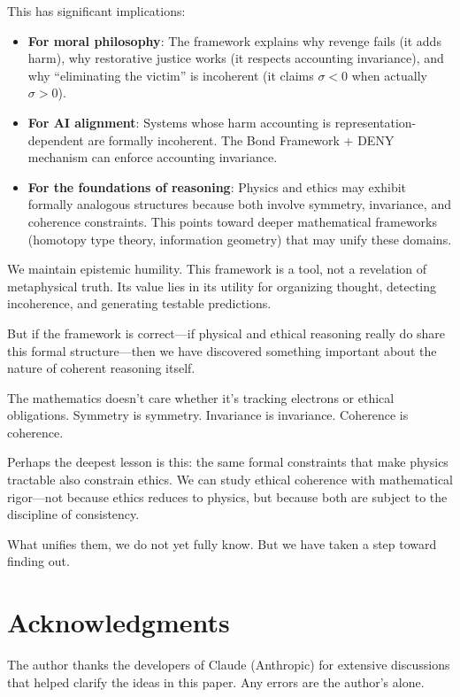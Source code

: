 \documentclass[12pt,letterpaper]{article}
\theoremstyle{definition}
\theoremstyle{remark}
\begin{document}
This has significant implications:
\begin{itemize}
    \item \textbf{For moral philosophy}: The framework explains why revenge fails (it adds harm), why restorative justice works (it respects accounting invariance), and why ``eliminating the victim'' is incoherent (it claims $\sigma < 0$ when actually $\sigma > 0$).
    
    \item \textbf{For AI alignment}: Systems whose harm accounting is representation-dependent are formally incoherent. The Bond Framework + DENY mechanism can enforce accounting invariance.
    
    \item \textbf{For the foundations of reasoning}: Physics and ethics may exhibit formally analogous structures because both involve symmetry, invariance, and coherence constraints. This points toward deeper mathematical frameworks (homotopy type theory, information geometry) that may unify these domains.
\end{itemize}

We maintain epistemic humility. This framework is a tool, not a revelation of metaphysical truth. Its value lies in its utility for organizing thought, detecting incoherence, and generating testable predictions.

But if the framework is correct---if physical and ethical reasoning really do share this formal structure---then we have discovered something important about the nature of coherent reasoning itself.

The mathematics doesn't care whether it's tracking electrons or ethical obligations. Symmetry is symmetry. Invariance is invariance. Coherence is coherence.

Perhaps the deepest lesson is this: the same formal constraints that make physics tractable also constrain ethics. We can study ethical coherence with mathematical rigor---not because ethics reduces to physics, but because both are subject to the discipline of consistency.

What unifies them, we do not yet fully know. But we have taken a step toward finding out.

\section*{Acknowledgments}

The author thanks the developers of Claude (Anthropic) for extensive discussions that helped clarify the ideas in this paper. Any errors are the author's alone.
\end{document}
